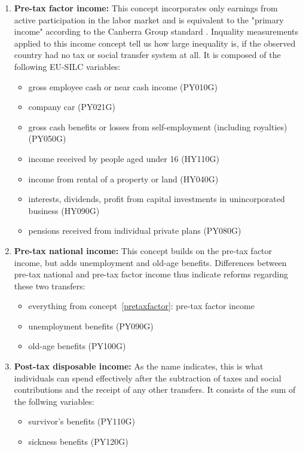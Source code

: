 \documentclass[a4paper]{article}\usepackage[]{graphicx}\usepackage[]{color}
\begin{document}
\begin{enumerate}
  \item \label{pretaxfactor} \textbf{Pre-tax factor income:} This concept incorporates only earnings from active participation in the labor market and is equivalent to the "primary income" according to the Canberra Group standard \parencite{canberra}. Inquality measurements applied to this income concept tell us how large inequality is, if the observed country had no tax or social transfer system at all. It is composed of the following EU-SILC variables:
  \begin{itemize}
    \item gross employee cash or near cash income (PY010G)
    \item company car (PY021G)
    \item gross cash benefits or losses from self-employment (including royalties) (PY050G)
    \item income received by people aged under 16 (HY110G)
    \item income from rental of a property or land (HY040G)
    \item	interests, dividends, profit from capital investments in unincorporated business (HY090G)
    \item pensions received from individual private plans (PY080G)
  \end{itemize}
\item \label{pretaxnational} \textbf{Pre-tax national income:} This concept builds on the pre-tax factor income, but adds unemployment and old-age benefits. Differences between pre-tax national and pre-tax factor income thus indicate reforms regarding these two transfers:
  \begin{itemize}
  \item everything from concept~\ref{pretaxfactor}: pre-tax factor income
  \item unemployment benefits (PY090G)
  \item old-age benefits (PY100G)
  \end{itemize}
\item \textbf{Post-tax disposable income:} As the name indicates, this is what individuals can spend effectively after the subtraction of taxes and social contributions and the receipt of any other transfers. It consists of the sum of the follwing variables:
\begin{itemize}
  \item survivor's benefits (PY110G) 
  \item sickness benefits (PY120G) 

\end{itemize}
\end{enumerate}
\end{document}
